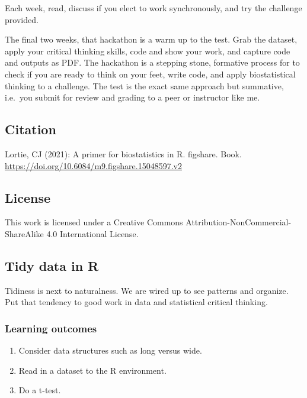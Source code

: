 \documentclass[
]{book}
\providecommand{\tightlist}{%
  \setlength{\itemsep}{0pt}\setlength{\parskip}{0pt}}
\begin{document}
Each week, read, discuss if you elect to work synchronously, and try the challenge provided.

The final two weeks, that hackathon is a warm up to the test. Grab the dataset, apply your critical thinking skills, code and show your work, and capture code and outputs as PDF. The hackathon is a stepping stone, formative process for to check if you are ready to think on your feet, write code, and apply biostatistical thinking to a challenge. The test is the exact same approach but summative, i.e.~you submit for review and grading to a peer or instructor like me.

\hypertarget{citation}{%
\subsection*{Citation}\label{citation}}

Lortie, CJ (2021): A primer for biostatistics in R. figshare. Book. \url{https://doi.org/10.6084/m9.figshare.15048597.v2}

\hypertarget{license}{%
\subsection*{License}\label{license}}

This work is licensed under a Creative Commons Attribution-NonCommercial-ShareAlike 4.0 International License.

\hypertarget{tidy-data-in-r}{%
\subsection*{Tidy data in R}\label{tidy-data-in-r}}

Tidiness is next to naturalness. We are wired up to see patterns and organize. Put that tendency to good work in data and statistical critical thinking.

\hypertarget{learning-outcomes-1}{%
\subsubsection*{Learning outcomes}\label{learning-outcomes-1}}

\begin{enumerate}
\def\labelenumi{\arabic{enumi}.}
\tightlist
\item
  Consider data structures such as long versus wide.\\
\item
  Read in a dataset to the R environment.\\
\item
  Do a t-test.
\end{enumerate}
\end{document}
